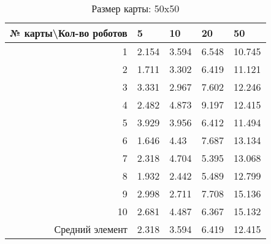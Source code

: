 \begin{table}[H]
\centering
\begin{tabular}{|r|l|l|l|l|}
\hline
№ карты\textbackslash Кол-во роботов & \textbf{5} & \textbf{10} & \textbf{20} & \textbf{50}\\ \hline
1 & 2.154 & 3.594 & 6.548 & 10.745\\ \hline
2 & 1.711 & 3.302 & 6.419 & 11.121\\ \hline
3 & 3.331 & 2.967 & 7.602 & 12.246\\ \hline
4 & 2.482 & 4.873 & 9.197 & 12.415\\ \hline
5 & 3.929 & 3.956 & 6.412 & 11.494\\ \hline
6 & 1.646 & 4.43 & 7.687 & 13.134\\ \hline
7 & 2.318 & 4.704 & 5.395 & 13.068\\ \hline
8 & 1.932 & 2.442 & 5.489 & 12.799\\ \hline
9 & 2.998 & 2.711 & 7.708 & 15.136\\ \hline
10 & 2.681 & 4.487 & 6.367 & 15.132\\ \hline
Средний элемент & 2.318 & 3.594 & 6.419 & 12.415\\ \hline
\end{tabular}
\caption*{Размер карты: 50x50}
\end{table}
